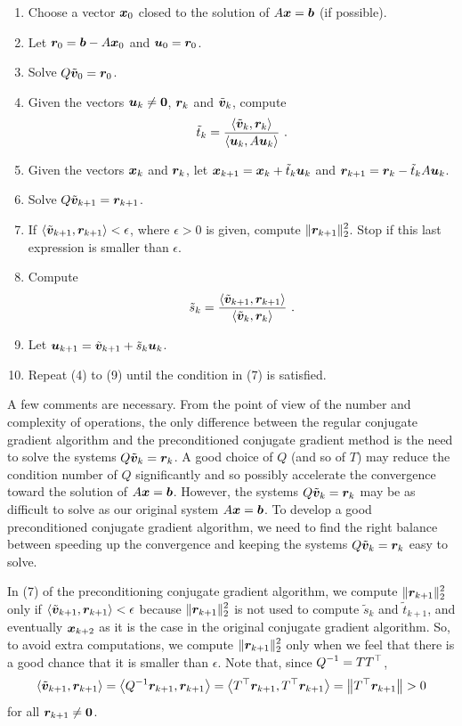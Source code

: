 \begin{algo}
\begin{enumerate}
\item Choose a vector $\bm{x}_{0}$ closed to the solution of
$A \bm{x} = \bm{b}$ (if possible).
\item Let $\bm{r}_0 = \bm{b}-A\bm{x}_0$ and
$\bm{u}_0 = \bm{r}_0$.
\item Solve $Q\tilde{\bm{v}}_0 = \bm{r}_0$.
\item Given the vectors $\bm{u}_k \neq \bm{0}$,
$\bm{r}_k$ and $\tilde{\bm{v}}_k$, compute
\[
\tilde{t}_k =
\frac{\ps{\tildev{v}_k}{\VEC{r}_k}}{\ps{\VEC{u}_k}{A\VEC{u}_k}} \ .
\]
\item Given the vectors $\bm{x}_k$ and $\bm{r}_k$, let
$\bm{x}_{k+1} = \bm{x}_k + \tilde{t}_k \bm{u}_k$
and $\bm{r}_{k+1} = \bm{r}_k - \tilde{t}_k A \bm{u}_k$.
\item Solve $Q\tilde{\bm{v}}_{k+1} = \bm{r}_{k+1}$.
\item If
$\left\langle{\tilde{\bm{v}}_{k+1}} , {\bm{r}_{k+1}}\right\rangle < \epsilon$, where $\epsilon>0$ is
given, compute $\displaystyle \| \bm{r}_{k+1} \|_2^2$.  Stop if this last
expression is smaller than $\epsilon$.
\item Compute
\[
\tilde{s}_k =
\frac{\left\langle{\tilde{\bm{v}}_{k+1}} , {\bm{r}_{k+1}}\right\rangle}
{\left\langle{\tilde{\bm{v}}_k} , {\bm{r}_k}\right\rangle} \ .
\]
\item Let
$\bm{u}_{k+1} = \tilde{\bm{v}}_{k+1} + \tilde{s}_k \bm{u}_k$.
\item Repeat (4) to (9) until the condition in (7) is satisfied.
\end{enumerate}
\end{algo}

A few comments are necessary.  From the point of view of the number
and complexity of operations, the only difference between the
regular conjugate gradient algorithm and the preconditioned conjugate
gradient method is the need to solve the systems
$Q\tilde{\bm{v}}_k = \bm{r}_k$.  A good choice of $Q$ (and so of $T$) may
reduce the condition number of $Q$ significantly and so possibly
accelerate the convergence toward the solution of $A\bm{x}=\bm{b}$.
However, the systems $Q\tilde{\bm{v}}_k = \bm{r}_k$ may be as difficult
to solve as our original system $A\bm{x} = \bm{b}$.  To develop a good
preconditioned conjugate gradient algorithm, we need to find the
right balance between speeding up the convergence and keeping the
systems $Q\tilde{\bm{v}}_k = \bm{r}_k$ easy to solve.

In (7) of the preconditioning conjugate gradient algorithm, we compute
$\displaystyle \| \bm{r}_{k+1} \|_2^2$ only if
$\left\langle{\tilde{\bm{v}}_{k+1}} , {\bm{r}_{k+1}}\right\rangle < \epsilon$
because $\displaystyle \| \bm{r}_{k+1} \|_2^2$ is not used to compute
$\tilde{s}_k$ and
$\tilde{t}_{k+1}$, and eventually $\bm{x}_{k+2}$ as it is the case in the
original conjugate gradient algorithm.  So, to avoid extra
computations, we compute $\displaystyle \| \bm{r}_{k+1} \|_2^2$ only
when we feel that there is a good chance that it is smaller than $\epsilon$.
Note that, since $\displaystyle Q^{-1} = TT^\top$,
\[
\left\langle{\tilde{\bm{v}}_{k+1}} , {\bm{r}_{k+1}}\right\rangle
= \left\langle{Q^{-1}\bm{r}_{k+1}} , {\bm{r}_{k+1}}\right\rangle
= \left\langle{T^\top\bm{r}_{k+1}} , {T^\top\bm{r}_{k+1}}\right\rangle
= \left\| T^\top \bm{r}_{k+1}\right\| > 0
\]
for all $\bm{r}_{k+1} \neq \bm{0}$.

